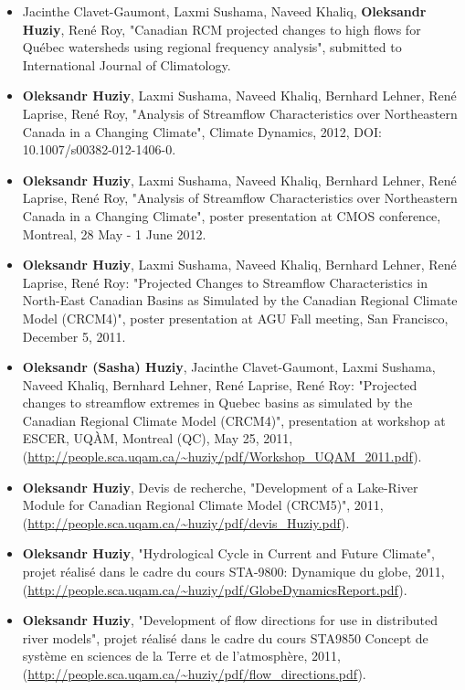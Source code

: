 \documentclass[12pt,a4paper,sans]{moderncv}
\begin{document}
\begin{itemize}
    \item Jacinthe Clavet-Gaumont, Laxmi Sushama, Naveed Khaliq,
    \textbf{Oleksandr Huziy}, René Roy, "Canadian RCM projected changes to high
    flows for Québec watersheds using regional frequency analysis", submitted to International Journal of Climatology.
    
    \item \textbf{Oleksandr Huziy}, Laxmi Sushama, Naveed Khaliq, Bernhard
    Lehner, René Laprise, René Roy, "Analysis of Streamflow Characteristics over Northeastern Canada 
     in a Changing Climate", Climate Dynamics, 2012, DOI:
     10.1007/s00382-012-1406-0.
    \item \textbf{Oleksandr Huziy}, Laxmi Sushama, Naveed Khaliq, Bernhard Lehner,
     René Laprise, René Roy, "Analysis of Streamflow Characteristics over Northeastern Canada 
     in a Changing Climate", poster presentation at CMOS conference, Montreal,
     28 May - 1 June 2012.
    \item \textbf{Oleksandr Huziy}, Laxmi Sushama, Naveed Khaliq, Bernhard Lehner, René
    Laprise, René Roy: "Projected Changes to Streamflow Characteristics in
    North-East Canadian Basins as Simulated by the Canadian Regional Climate
    Model (CRCM4)", poster presentation at AGU Fall meeting, San Francisco,
    December 5, 2011.
    \item \textbf{Oleksandr (Sasha) Huziy}, Jacinthe Clavet-Gaumont, Laxmi
    Sushama, Naveed Khaliq, Bernhard Lehner, René Laprise, René Roy: "Projected changes to streamflow extremes in Quebec
    basins as simulated by the Canadian Regional Climate Model (CRCM4)",
    presentation at workshop at ESCER, UQÀM, Montreal (QC), May 25, 2011,
    (\url{http://people.sca.uqam.ca/~huziy/pdf/Workshop_UQAM_2011.pdf}).
   
    \item \textbf{Oleksandr Huziy}, Devis de recherche, "Development of a
    Lake-River Module for Canadian Regional Climate Model (CRCM5)", 2011,
    (\url{http://people.sca.uqam.ca/~huziy/pdf/devis_Huziy.pdf}).
   
    \item \textbf{Oleksandr Huziy}, "Hydrological Cycle in Current and Future Climate",
    projet réalisé dans le cadre du cours STA-9800: Dynamique du globe, 2011,\\
     (\url{http://people.sca.uqam.ca/~huziy/pdf/GlobeDynamicsReport.pdf}).
   
    \item \textbf{Oleksandr Huziy}, "Development of flow directions for use in
    distributed river models", projet réalisé dans le cadre du cours STA9850
    Concept de système en sciences de la Terre et de l'atmosphère, 2011,
    (\url{http://people.sca.uqam.ca/~huziy/pdf/flow_directions.pdf}).
   

\end{itemize}
\end{document}
